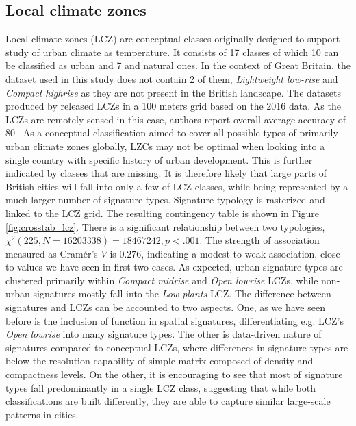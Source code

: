 \documentclass[fleqn,10pt]{wlscirep}
\begin{document}
\subsection*{Local climate zones}
Local climate zones (LCZ) are conceptual classes originally designed to support study of urban
climate as temperature. It consists of 17 classes of which 10 can be classified as urban
and 7 and natural ones. In the context of Great Britain, the dataset used in this study
does not contain 2 of them, \textit{Lightweight low-rise} and \textit{Compact highrise}
as they are not present in the British landscape. The datasets produced by
\cite{demuzere2019mapping} released LCZs in a 100 meters grid based on the 2016 data. As
the LCZs are remotely sensed in this case, authors report overall average accuracy of 80 \
As a conceptual classification aimed to cover all possible types of primarily urban climate zones globally,
LZCs may not be optimal when looking into a single country with specific history of urban
development. This is further indicated by classes that are missing. It is therefore likely
that large parts of British cities will fall into only a few of LCZ classes, while being represented
by a much larger number of signature types.
Signature typology is rasterized and linked to the LCZ grid.
The resulting contingency table is shown in Figure \ref{fig:crosstab_lcz}. There is a
significant relationship between two typologies, $\chi^{2} (225, N = 16203338) = 18467242,
p < .001$. The strength of association measured as Cramér's $V$ is $0.276$, indicating
a modest to weak association, close to values we have seen in first two cases. As expected,
urban signature types are clustered primarily within \textit{Compact midrise} and
\textit{Open lowrise} LCZs, while non-urban signatures mostly fall into the \textit{Low plants} LCZ.
The difference between signatures and LCZs can be accounted to two aspects. One, as we have seen
before is the inclusion of function in spatial signatures, differentiating e.g. LCZ's \textit{Open lowrise} into
many signature types. The other is data-driven nature of signatures compared to conceptual LCZs,
where differences in signature types are below the resolution capability of simple matrix composed of
density and compactness levels. On the other, it is encouraging to see that most of signature types
fall predominantly in a single LCZ class, suggesting that while both classifications are built differently,
they are able to capture similar large-scale patterns in cities.
\end{document}
